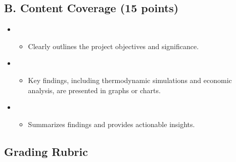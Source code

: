 \documentclass[letterpaper,10pt,english]{jupyterBook}
\begin{document}
\subsection{B. Content Coverage (15 points)}
\label{\detokenize{ProjectSyllabus:id5}}\begin{itemize}
\item {} 
\sphinxAtStartPar
{}
\begin{itemize}
\item {} 
\sphinxAtStartPar
Clearly outlines the project objectives and significance.

\end{itemize}

\item {} 
\sphinxAtStartPar
{}
\begin{itemize}
\item {} 
\sphinxAtStartPar
Key findings, including thermodynamic simulations and economic analysis, are presented in graphs or charts.

\end{itemize}

\item {} 
\sphinxAtStartPar
{}
\begin{itemize}
\item {} 
\sphinxAtStartPar
Summarizes findings and provides actionable insights.

\end{itemize}

\end{itemize}


\subsection{Grading Rubric}
\label{\detokenize{ProjectSyllabus:id6}}
\end{document}
